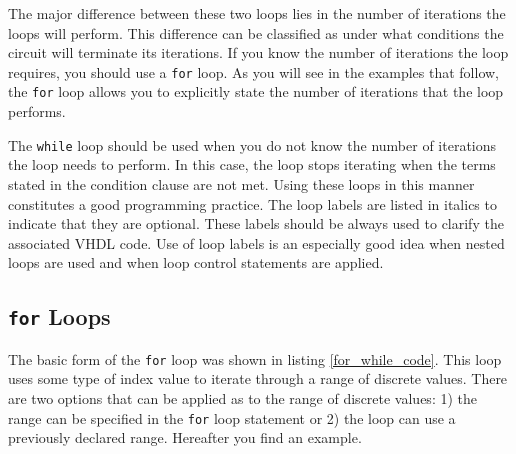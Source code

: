 The major difference between these two loops lies in the number of iterations the loops will perform. This difference can be classified as under what conditions the circuit will terminate its iterations. If you know the number of iterations the loop requires, you should use a \texttt{for} loop. As you will see in the examples that follow, the \texttt{for} loop allows you to explicitly state the number of iterations that the loop performs. 

The \texttt{while} loop should be used when you do not know the number of iterations the loop needs to perform. In this case, the loop stops iterating when the terms stated in the condition clause are not met. Using these loops in this manner constitutes a good programming practice. The loop labels are listed in italics to indicate that they are optional. These labels should be always used to clarify the associated VHDL code. Use of loop labels is an especially good idea when nested loops are used and when loop control statements are applied. 

\subsection{\texttt{for} Loops}
The basic form of the \texttt{for} loop was shown in listing \ref{for_while_code}. This loop uses some type of index value to iterate through a range of discrete values. There are two options that can be applied as to the range of discrete values: 1) the range can be specified in the \texttt{for} loop statement or 2) the loop can use a previously declared range. Hereafter you find  an example.

